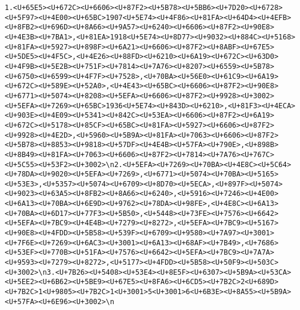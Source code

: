 \documentclass[
]{article}
\begin{document}
\begin{verbatim}
1.<U+65E5><U+672C><U+6606><U+87F2><U+5B78><U+5BB6><U+7D20><U+6728><U+5F97><U+4E00><U+65BC>1907<U+5E74><U+4F86><U+81FA><U+64D4><U+4EFB><U+8FB2><U+696D><U+8A66><U+9A57><U+6240><U+6606><U+87F2><U+90E8><U+4E3B><U+7BA1>,<U+81EA>1918<U+5E74><U+8D77><U+9032><U+884C><U+5168><U+81FA><U+5927><U+898F><U+6A21><U+6606><U+87F2><U+8ABF><U+67E5><U+5DE5><U+4F5C>,<U+4E26><U+88FD><U+6210><U+6A19><U+672C><U+63D0><U+4F9B><U+5E2B><U+751F><U+7814><U+7A76><U+8207><U+6559><U+5B78><U+6750><U+6599><U+4F7F><U+7528>,<U+70BA><U+56E0><U+61C9><U+6A19><U+672C><U+589E><U+52A0>,<U+4E43><U+65BC><U+6606><U+87F2><U+90E8><U+6771><U+5074><U+8208><U+5EFA><U+6606><U+87F2><U+9928><U+3002><U+5EFA><U+7269><U+65BC>1936<U+5E74><U+843D><U+6210>,<U+81F3><U+4ECA><U+903E><U+4E09><U+5341><U+842C><U+53EA><U+6606><U+87F2><U+6A19><U+672C><U+5178><U+85CF><U+65BC><U+81FA><U+5927><U+6606><U+87F2><U+9928><U+4E2D>,<U+5960><U+5B9A><U+81FA><U+7063><U+6606><U+87F2><U+5B78><U+8853><U+9818><U+57DF><U+4E4B><U+57FA><U+790E>,<U+898B><U+8B49><U+81FA><U+7063><U+6606><U+87F2><U+7814><U+7A76><U+767C><U+5C55><U+53F2><U+3002>\n2.<U+5EFA><U+7269><U+70BA><U+4E8C><U+5C64><U+78DA><U+9020><U+5EFA><U+7269>,<U+6771><U+5074><U+70BA><U+5165><U+53E3>,<U+5357><U+5074><U+6709><U+8D70><U+5ECA>,<U+897F><U+5074><U+9023><U+63A5><U+8FB2><U+8A66><U+6240>,<U+5916><U+7246><U+4E00><U+6A13><U+70BA><U+6E9D><U+9762><U+78DA><U+98FE>,<U+4E8C><U+6A13><U+70BA><U+6D17><U+77F3><U+5B50>,<U+5448><U+73FE><U+7576><U+6642><U+5EFA><U+7BC9><U+4E4B><U+7279><U+8272>,<U+5EFA><U+7BC9><U+5167><U+90E8><U+4FDD><U+5B58><U+539F><U+6709><U+9580><U+7A97><U+3001><U+7F6E><U+7269><U+6AC3><U+3001><U+6A13><U+68AF><U+7B49>,<U+7686><U+53EF><U+770B><U+51FA><U+7576><U+6642><U+5EFA><U+7BC9><U+7A7A><U+9593><U+7279><U+8272>,<U+5177><U+4FDD><U+5B58><U+50F9><U+503C><U+3002>\n3.<U+7B26><U+5408><U+53E4><U+8E5F><U+6307><U+5B9A><U+53CA><U+5EE2><U+6B62><U+5BE9><U+67E5><U+8FA6><U+6CD5><U+7B2C>2<U+689D><U+7B2C>1<U+9805><U+7B2C>1<U+3001>5<U+3001>6<U+6B3E><U+8A55><U+5B9A><U+57FA><U+6E96><U+3002>\n

\end{verbatim}
\end{document}
